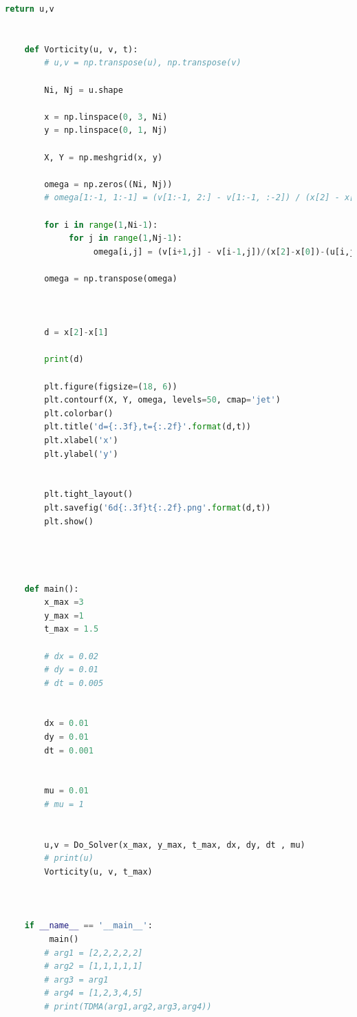 \documentclass[12pt]{article}
\begin{document}
\begin{scriptsize}
\begin{lstlisting}[language=python,caption={Extended Region using ADI Solver}]
        return u,v
    
    
    def Vorticity(u, v, t):
        # u,v = np.transpose(u), np.transpose(v)
    
        Ni, Nj = u.shape
    
        x = np.linspace(0, 3, Ni)
        y = np.linspace(0, 1, Nj)
    
        X, Y = np.meshgrid(x, y)
    
        omega = np.zeros((Ni, Nj))
        # omega[1:-1, 1:-1] = (v[1:-1, 2:] - v[1:-1, :-2]) / (x[2] - x[1]) - (u[2:, 1:-1] - u[:-2, 1:-1]) / (y[2] - y[1])
    
        for i in range(1,Ni-1):
             for j in range(1,Nj-1):
                  omega[i,j] = (v[i+1,j] - v[i-1,j])/(x[2]-x[0])-(u[i,j+1] - u[i,j-1])/(y[2] - y[0])
        
        omega = np.transpose(omega)
    
    
    
        d = x[2]-x[1]
    
        print(d)
    
        plt.figure(figsize=(18, 6))
        plt.contourf(X, Y, omega, levels=50, cmap='jet')
        plt.colorbar()
        plt.title('d={:.3f},t={:.2f}'.format(d,t))
        plt.xlabel('x')
        plt.ylabel('y')
    
    
        plt.tight_layout()
        plt.savefig('6d{:.3f}t{:.2f}.png'.format(d,t))
        plt.show()
    
        
    
    
    def main():
        x_max =3
        y_max =1
        t_max = 1.5
    
        # dx = 0.02
        # dy = 0.01
        # dt = 0.005
    
    
        dx = 0.01
        dy = 0.01
        dt = 0.001
    
    
        mu = 0.01
        # mu = 1
    
    
        u,v = Do_Solver(x_max, y_max, t_max, dx, dy, dt , mu)
        # print(u)
        Vorticity(u, v, t_max)
    
    
    
    if __name__ == '__main__':
         main()
        # arg1 = [2,2,2,2,2]
        # arg2 = [1,1,1,1,1]
        # arg3 = arg1
        # arg4 = [1,2,3,4,5]
        # print(TDMA(arg1,arg2,arg3,arg4))
    
    
    
    
    
    


\end{lstlisting}

















\end{scriptsize}




\end{document}
